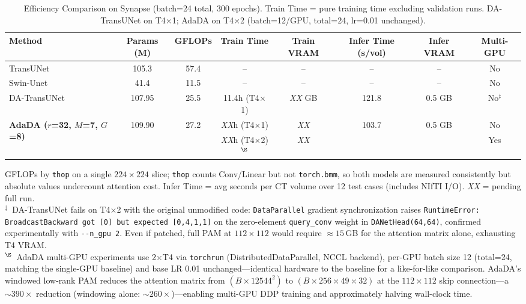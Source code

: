 \documentclass[conference]{IEEEtran}
\begin{document}
\begin{table}[t]
  \caption{Efficiency Comparison on Synapse (batch=24 total, 300 epochs). Train Time = pure training time excluding validation runs. DA-TransUNet on T4$\times$1; AdaDA on T4$\times$2 (batch=12/GPU, total=24, lr=0.01 unchanged).}
  \label{tab:efficiency}
  \begin{center}
  \setlength{\tabcolsep}{5pt}
  \begin{tabular}{lccccccc}
    \toprule
    Method & Params (M) & GFLOPs & Train Time & Train VRAM & Infer Time (s/vol) & Infer VRAM & Multi-GPU \\
    \midrule
    TransUNet~\cite{chen2021transunet}     & 105.3       & 57.4        & --               & --               & --               & --               & No \\
    Swin-Unet~\cite{cao2022swinunet}       & 41.4        & 11.5        & --               & --               & --               & --               & No \\
    DA-TransUNet~\cite{sun2024datransunet} & 107.95      & 25.5 & 11.4h (T4$\times$1) & \textit{XX} GB   & 121.8            & 0.5 GB           & No$^\ddagger$ \\
    \midrule
    \multirow{2}{*}{\textbf{AdaDA ($r$=32, $M$=7, $G$=8)}}
      & \multirow{2}{*}{109.90} & \multirow{2}{*}{27.2}
      & \textit{XX}h (T4$\times$1) & \textit{XX} & \multirow{2}{*}{103.7} & \multirow{2}{*}{0.5 GB} & No \\
      & & & \textit{XX}h (T4$\times$2)$^\S$ & \textit{XX} & & & Yes \\
    \bottomrule
  \end{tabular}
  \end{center}
  \vspace{-0.4em}
  \footnotesize{GFLOPs by \texttt{thop} on a single $224\!\times\!224$ slice; \texttt{thop} counts Conv/Linear but not \texttt{torch.bmm}, so both models are measured consistently but absolute values undercount attention cost. Infer Time = avg seconds per CT volume over 12 test cases (includes NIfTI I/O). \textit{XX} = pending full run.\\
  $^\ddagger$~DA-TransUNet fails on T4$\times$2 with the original unmodified code: \texttt{DataParallel} gradient synchronization raises \texttt{RuntimeError: BroadcastBackward got [0] but expected [0,4,1,1]} on the zero-element \texttt{query\_conv} weight in \texttt{DANetHead(64,64)}, confirmed experimentally with \texttt{{-}{-}n\_gpu~2}. Even if patched, full PAM at $112{\times}112$ would require ${\approx}15$\,GB for the attention matrix alone, exhausting T4 VRAM.\\
  $^\S$~AdaDA multi-GPU experiments use 2$\times$T4 via \texttt{torchrun} (DistributedDataParallel, NCCL backend), per-GPU batch size 12 (total=24, matching the single-GPU baseline) and base LR 0.01 unchanged—identical hardware to the baseline for a like-for-like comparison. AdaDA's windowed low-rank PAM reduces the attention matrix from $(B\!\times\!12544^2)$ to $(B\!\times\!256\!\times\!49\!\times\!32)$ at the $112\!\times\!112$ skip connection—a ${\sim}390\times$ reduction (windowing alone: ${\sim}260\times$)—enabling multi-GPU DDP training and approximately halving wall-clock time.}
\end{table}
\end{document}
